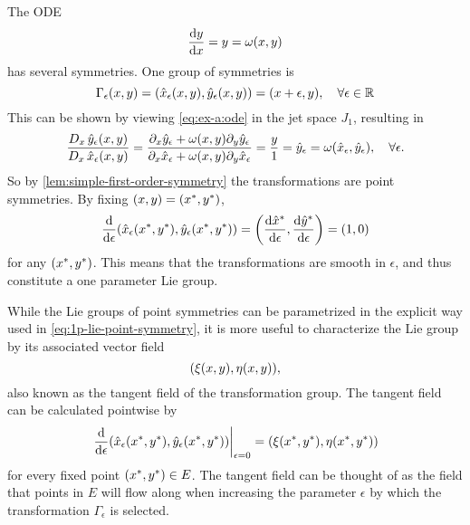 \begin{exmp}
  The ODE
  \begin{equation} \label{eq:ex-a:ode}
    \dv{y}{x} = y = \omega(x, y)
  \end{equation}
  has several symmetries.
  One group of symmetries is
  \begin{equation} \label{eq:ex-a:transformation}
    \Gamma_\epsilon(x,y) =
    \pqty{\hat{x}_\epsilon(x,y), \hat{y}_\epsilon(x,y)} =
    \pqty{x + \epsilon, y}, \quad
    \forall \epsilon \in \reals
  \end{equation}
  This can be shown by viewing \cref{eq:ex-a:ode} in the jet space \(J_1\), resulting in
  \begin{equation}
    \frac{D_{x}\, \hat{y}_\epsilon(x,y)}{D_{x}\, \hat{x}_\epsilon(x,y)} =
    \frac{\partial_x \hat{y}_\epsilon + \omega(x,y) \partial_y \hat{y}_\epsilon}{\partial_x \hat{x}_\epsilon + \omega(x,y) \partial_y \hat{x}_\epsilon} =
    \frac{y}{1} =
    \hat{y}_\epsilon =
    \omega(\hat{x}_\epsilon,\hat{y}_\epsilon), \quad
    \forall \epsilon.
  \end{equation}
  So by \cref{lem:simple-first-order-symmetry} the transformations are point symmetries.
  By fixing \(\pqty{x,y}=\pqty{\fixed{x},\fixed{y}}\),
  \begin{equation}
    \dv{\epsilon} \pqty{\hat{x}_\epsilon(\fixed{x},\fixed{y}), \hat{y}_\epsilon(\fixed{x},\fixed{y})} =
    \pqty{\dv{\fixed{\hat{x}}}{\epsilon}, \dv{\fixed{\hat{y}}}{\epsilon}} =
    \pqty{1,0}
  \end{equation}
  for any \(\pqty{\fixed{x},\fixed{y}}\).
  This means that the transformations are smooth in \(\epsilon\), and thus constitute a one parameter Lie group.
\end{exmp}
While the Lie groups of point symmetries can be parametrized in the explicit way used in \cref{eq:1p-lie-point-symmetry}, it is more useful to characterize the Lie group by its associated vector field
\begin{equation} \label{eq:tangent-field}
  \pqty{\xi(x,y), \eta(x,y)},
\end{equation}
also known as the tangent field of the transformation group.
The tangent field can be calculated pointwise by 
\begin{equation}
  \eval{\dv{\epsilon} \pqty{\hat{x}_\epsilon(\fixed{x},\fixed{y}), \hat{y}_\epsilon(\fixed{x},\fixed{y})}}_{\epsilon=0} = \pqty{\xi(\fixed{x},\fixed{y}), \eta(\fixed{x},\fixed{y})}
\end{equation}
for every fixed point \(\pqty{\fixed{x},\fixed{y}} \in E\).
The tangent field can be thought of as the field that points in \(E\) will flow along when increasing the parameter \(\epsilon\) by which the transformation \(\Gamma_\epsilon\) is selected.

